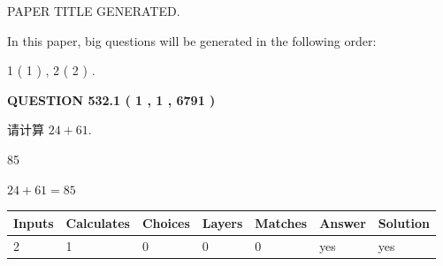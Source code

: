 \documentclass{ctexart}
\begin{document}
   
 \vspace{0.2in}
 
 
 
 
   
   
 PAPER TITLE GENERATED.
   
   
   
\vspace{0.2in}
   
In this paper, big questions will be generated in the following order: 
   
   
   1 ( 1 )
 ,
   2 ( 2 )
 .
  
\vspace{0.2in}
  
{\textbf{\Large{QUESTION
532.1 
 ( 1 , 1 , 6791 )
}}}
  
  
 
请计算 $ %
24 +  %
61 $.
 
 
 
\noindent{}
 
 

85
 
 
\noindent{}
 
 

 
 
 
\noindent{}
 
 

$ %
24 +  %
61=   %
85$
 
 
\noindent{}
 
 

 
   
   
   
   
\noindent\begin{tabular}{|l|l|l|l|l|l|l|}
 \hline
Inputs & Calculates & Choices & Layers & Matches & Answer & Solution \\ \hline
 2  & 
 1  & 
 0
  & 
 0  & 
 0  & 
  yes & 
  yes 
  \\ \hline
 \end{tabular}
   
   
   
   
\noindent{}
   
   
  
\end{document}
